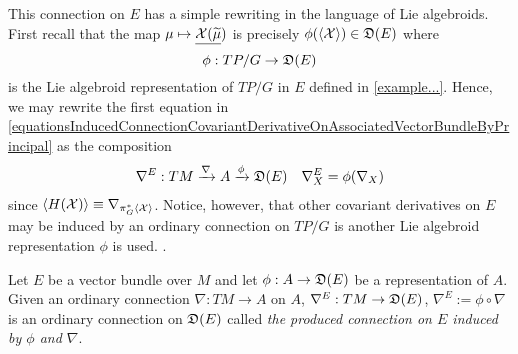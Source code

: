 \begin{example}
This connection on $E$ has a simple rewriting in the language of Lie algebroids. First recall that the map $\mu \mapsto \underline{\mathcal{X} (\widetilde{\mu}})$ is precisely $\phi(\cl{\ppal X}) \in \alg D(E)$ where 
\begin{equation}
    \phi: TP/G \to \alg D(E)
\end{equation} 
is the Lie algebroid representation of $TP/G$ in $E$ defined in \ref{example...}. Hence, we may rewrite the first equation in \eqref{equationsInducedConnectionCovariantDerivativeOnAssociatedVectorBundleByPrincipal} as the composition
\begin{align}
    \nabla^E : TM \xrightarrow{\nabla} A \xrightarrow{\phi} \alg D(E) && \nabla_X^E = \phi(\nabla_X)
\end{align}
since $\left\langle H(\mathcal{X}) \right\rangle \equiv \nabla_{\pi^*_G\left\langle \mathcal{X} \right\rangle}$. Notice, however, that other covariant derivatives on $E$ may be induced by an ordinary connection on $TP/G$ is another Lie algebroid representation $\phi$ is used. .
\end{example}

\begin{definition}
Let $E$ be a vector bundle over $M$ and let $\phi: A \to \alg D(E)$ be a representation of $A$. Given an ordinary connection $\nabla: TM \to A$ on $A$, $\nabla^E: TM \to \mathfrak{D}(E)$, $\nabla^E := \phi \circ \nabla$ is an ordinary connection on $\mathfrak{D}(E)$ called \emph{the produced connection on $E$ induced by $\phi$ and $\nabla$}.
\end{definition}

